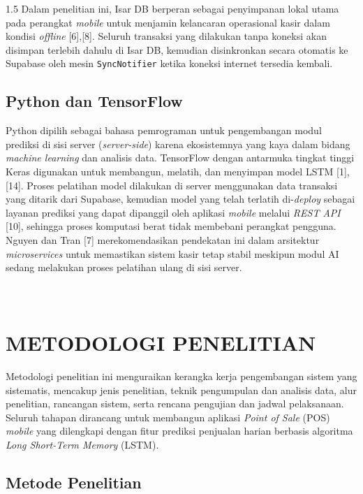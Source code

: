 \documentclass[12pt, a4paper, onecolumn, oneside]{report}
\begin{document}
\begin{spacing}{1.5}
Dalam penelitian ini, Isar DB berperan sebagai penyimpanan lokal utama pada perangkat \textit{mobile} untuk menjamin kelancaran operasional kasir dalam kondisi \textit{offline} [6],[8]. Seluruh transaksi yang dilakukan tanpa koneksi akan disimpan terlebih dahulu di Isar DB, kemudian disinkronkan secara otomatis ke Supabase oleh mesin \texttt{SyncNotifier} ketika koneksi internet tersedia kembali.

\section{Python dan TensorFlow}

Python dipilih sebagai bahasa pemrograman untuk pengembangan modul prediksi di sisi server (\textit{server-side}) karena ekosistemnya yang kaya dalam bidang \textit{machine learning} dan analisis data. TensorFlow dengan antarmuka tingkat tinggi Keras digunakan untuk membangun, melatih, dan menyimpan model LSTM [1],[14]. Proses pelatihan model dilakukan di server menggunakan data transaksi yang ditarik dari Supabase, kemudian model yang telah terlatih di-\textit{deploy} sebagai layanan prediksi yang dapat dipanggil oleh aplikasi \textit{mobile} melalui \textit{REST API} [10], sehingga proses komputasi berat tidak membebani perangkat pengguna. Nguyen dan Tran [7] merekomendasikan pendekatan ini dalam arsitektur \textit{microservices} untuk memastikan sistem kasir tetap stabil meskipun modul AI sedang melakukan proses pelatihan ulang di sisi server.

\chapter[METODOLOGI PENELITIAN]{\\ METODOLOGI PENELITIAN}

Metodologi penelitian ini menguraikan kerangka kerja pengembangan sistem yang sistematis, mencakup jenis penelitian, teknik pengumpulan dan analisis data, alur penelitian, rancangan sistem, serta rencana pengujian dan jadwal pelaksanaan. Seluruh tahapan dirancang untuk membangun aplikasi \textit{Point of Sale} (POS) \textit{mobile} yang dilengkapi dengan fitur prediksi penjualan harian berbasis algoritma \textit{Long Short-Term Memory} (LSTM).

\section{Metode Penelitian}


\end{spacing}
\end{document}
